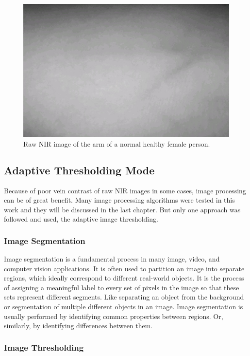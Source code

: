 \begin{figure}[H]
\centering
\includegraphics[scale=0.7]{figures/nirZein.JPG}
\caption[Raw NIR Image of an Arm with Poor Vein Contrast]{Raw NIR image of the arm of a normal healthy female person.}\label{fig:RawNirImage1}
\end{figure}

\subsection{Adaptive Thresholding Mode}
Because of poor vein contrast of raw NIR images in some cases, image processing can be of great benefit. Many image processing algorithms were tested in this work and they will be discussed in the last chapter. But only one approach was followed and used, the adaptive image thresholding.
\subsubsection{Image Segmentation}
Image segmentation is a fundamental process in many image, video, and computer vision applications. It is often used to partition an image into separate regions, which ideally correspond to different real-world objects\parencite{imageSeg}. It is the process of assigning a meaningful label to every set of pixels in the image so that these sets represent different segments. Like separating an object from the background or segmentation of multiple different objects in an image. Image segmentation is usually performed by identifying common properties between regions. Or, similarly, by identifying differences between them.

\subsubsection{Image Thresholding}

